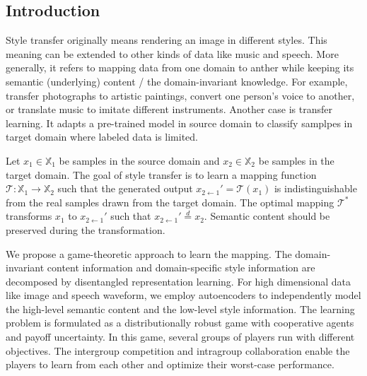 \documentclass{article}
\begin{document}
\subsection{Introduction}
Style transfer originally means rendering an image in different styles. This meaning can be extended to other kinds of data like music and speech. More generally, it refers to mapping data from one domain to anther while keeping {\color{blue} its semantic (underlying) content / the domain-invariant knowledge}. For example, transfer photographs to artistic paintings, convert one person's voice to another, or translate music to imitate different instruments. Another case is transfer learning. It adapts a pre-trained model in source domain to classify samplpes in target domain where labeled data is limited.

Let $x_1 \in \mathbb{X}_1$ be samples in the source domain and $x_2 \in \mathbb{X}_2$ be samples in the target domain. The goal of {\color{blue} style} transfer is to learn a mapping function $\mathcal{T}: \mathbb{X}_1 \rightarrow \mathbb{X}_2$ such that the generated output $x_{2\leftarrow1}' = \mathcal{T}(x_1)$ is indistinguishable from the real samples drawn from the target domain. The optimal mapping $\mathcal{T}^*$ transforms $x_1$ to $x_{2\leftarrow1}'$ such that $x_{2\leftarrow1}' \overset{d}{=} x_2$. Semantic content should be preserved during the transformation.

We propose a game-theoretic approach to learn the mapping. The domain-invariant content information and domain-specific style information are decomposed by disentangled representation learning. For high dimensional data like image and speech waveform, we employ autoencoders to independently model the high-level semantic content and the low-level style information. The learning problem is formulated as a distributionally robust game with {\color{blue} cooperative agents} and payoff uncertainty. In this game, several groups of players run with different objectives. The intergroup competition and intragroup collaboration enable the players to learn from each other and optimize their worst-case performance.
\end{document}
